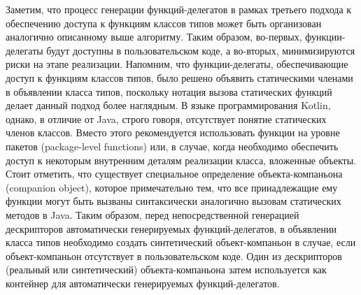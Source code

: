 Заметим, что процесс генерации функций-делегатов в рамках третьего подхода к обеспечению доступа к функциям классов типов может быть организован аналогично описанному выше алгоритму. Таким образом, во-первых, функции-делегаты будут доступны в пользовательском коде, а во-вторых, минимизируются риски на этапе реализации. Напомним, что функции-делегаты, обеспечивающие доступ к функциям классов типов, было решено объявить статическими членами в объявлении класса типов, поскольку нотация вызова статических функций делает данный подход более наглядным. В языке программирования Kotlin, однако, в отличие от Java, строго говоря, отсутствует понятие статических членов классов. Вместо этого рекомендуется использовать функции на уровне пакетов (package-level functions) или, в случае, когда необходимо обеспечить доступ к некоторым внутренним деталям реализации класса, вложенные объекты. Стоит отметить, что существует специальное определение объекта-компаньона (companion object), которое примечательно тем, что все принадлежащие ему функции могут быть вызваны синтаксически аналогично вызовам статических методов в Java. Таким образом, перед непосредственной генерацией дескрипторов автоматически генерируемых функций-делегатов, в объявлении класса типов необходимо создать синтетический объект-компаньон в случае, если объект-компаньон отсутствует в пользовательском коде. Один из дескрипторов (реальный или синтетический) объекта-компаньона затем используется как контейнер для автоматически генерируемых функций-делегатов. %


